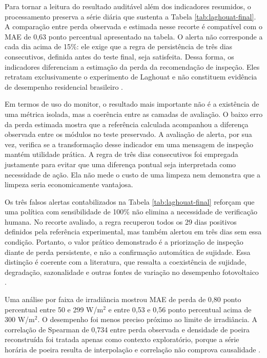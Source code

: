 \documentclass{UNESC}
\begin{document}
Para tornar a leitura do resultado auditável além dos indicadores resumidos, o processamento preserva a série diária que sustenta a Tabela \ref{tab:laghouat-final}. A comparação entre perda observada e estimada nesse recorte é compatível com o MAE de 0,63 ponto percentual apresentado na tabela. O alerta não corresponde a cada dia acima de 15\%: ele exige que a regra de persistência de três dias consecutivos, definida antes do teste final, seja satisfeita. Dessa forma, os indicadores diferenciam a estimação da perda da recomendação de inspeção. Eles retratam exclusivamente o experimento de Laghouat e não constituem evidência de desempenho residencial brasileiro \cite{seghir2026}.

Em termos de uso do monitor, o resultado mais importante não é a existência de uma métrica isolada, mas a coerência entre as camadas de avaliação. O baixo erro da perda estimada mostra que a referência calculada acompanhou a diferença observada entre os módulos no teste preservado. A avaliação de alerta, por sua vez, verifica se a transformação desse indicador em uma mensagem de inspeção mantém utilidade prática. A regra de três dias consecutivos foi empregada justamente para evitar que uma diferença pontual seja interpretada como necessidade de ação. Ela não mede o custo de uma limpeza nem demonstra que a limpeza seria economicamente vantajosa.

Os três falsos alertas contabilizados na Tabela \ref{tab:laghouat-final} reforçam que uma política com sensibilidade de 100\% não elimina a necessidade de verificação humana. No recorte avaliado, a regra recuperou todos os 29 dias positivos definidos pela referência experimental, mas também alertou em três dias sem essa condição. Portanto, o valor prático demonstrado é a priorização de inspeção diante de perda persistente, e não a confirmação automática de sujidade. Essa distinção é coerente com a literatura, que ressalta a coexistência de sujidade, degradação, sazonalidade e outras fontes de variação no desempenho fotovoltaico \cite{skomedal2020}.

Uma análise por faixa de irradiância mostrou MAE de perda de 0,80 ponto percentual entre 50 e 299 W/m$^2$ e entre 0,53 e 0,56 ponto percentual acima de 300 W/m$^2$. O desempenho foi menos preciso próximo ao limite de irradiância. A correlação de Spearman de 0,734 entre perda observada e densidade de poeira reconstruída foi tratada apenas como contexto exploratório, porque a série horária de poeira resulta de interpolação e correlação não comprova causalidade \cite{seghir2026}.
\end{document}
